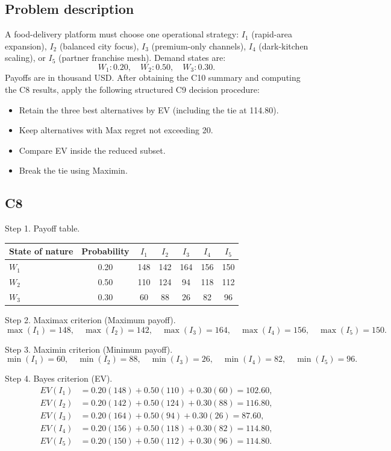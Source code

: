 \begin{ExamProblems}
		\subsection*{Problem description}
		A food-delivery platform must choose one operational strategy:
		$I_1$ (rapid-area expansion), $I_2$ (balanced city focus), $I_3$ (premium-only channels), $I_4$ (dark-kitchen scaling), or $I_5$ (partner franchise mesh).
		Demand states are:
		\[
		W_1:0.20,\quad W_2:0.50,\quad W_3:0.30.
		\]
		Payoffs are in thousand USD.
		After obtaining the C10 summary and computing the C8 results, apply the following structured C9 decision procedure:
		\begin{itemize}
			\item Retain the three best alternatives by EV (including the tie at 114.80).
			\item Keep alternatives with Max regret not exceeding 20.
			\item Compare EV inside the reduced subset.
			\item Break the tie using Maximin.
		\end{itemize}

		\subsection*{C8}
		Step 1. Payoff table.
		\begin{center}
			\begin{tabular}{l c c c c c c}
				\toprule
				State of nature & Probability & $I_1$ & $I_2$ & $I_3$ & $I_4$ & $I_5$ \\
				\midrule
				$W_1$ & 0.20 & 148 & 142 & 164 & 156 & 150 \\
				$W_2$ & 0.50 & 110 & 124 & 94 & 118 & 112 \\
				$W_3$ & 0.30 & 60 & 88 & 26 & 82 & 96 \\
				\bottomrule
			\end{tabular}
		\end{center}

		Step 2. Maximax criterion (Maximum payoff).
		\[
		\max(I_1)=148,\quad \max(I_2)=142,\quad \max(I_3)=164,\quad \max(I_4)=156,\quad \max(I_5)=150.
		\]

		Step 3. Maximin criterion (Minimum payoff).
		\[
		\min(I_1)=60,\quad \min(I_2)=88,\quad \min(I_3)=26,\quad \min(I_4)=82,\quad \min(I_5)=96.
		\]

		Step 4. Bayes criterion (EV).
		\[
		\begin{aligned}
		EV(I_1)&=0.20(148)+0.50(110)+0.30(60)=102.60,\\
		EV(I_2)&=0.20(142)+0.50(124)+0.30(88)=116.80,\\
		EV(I_3)&=0.20(164)+0.50(94)+0.30(26)=87.60,\\
		EV(I_4)&=0.20(156)+0.50(118)+0.30(82)=114.80,\\
		EV(I_5)&=0.20(150)+0.50(112)+0.30(96)=114.80.
		\end{aligned}
		\]


\end{ExamProblems}
